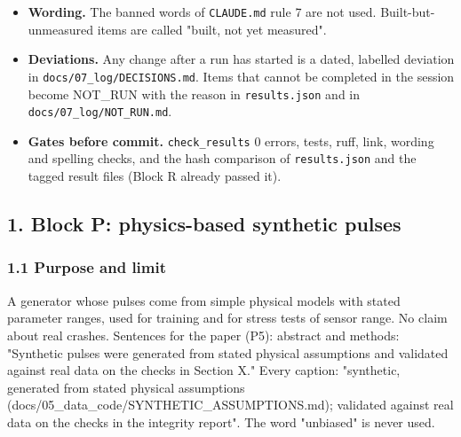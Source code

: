 \begin{itemize}
\item \textbf{Wording.} The banned words of \texttt{CLAUDE.md} rule 7 are not used. Built-but-unmeasured items are called "built, not yet measured".
\item \textbf{Deviations.} Any change after a run has started is a dated, labelled deviation in \texttt{docs/07\_log/DECISIONS.md}. Items that cannot be completed in the session become NOT\_RUN with the reason in \texttt{results.json} and in \texttt{docs/07\_log/NOT\_RUN.md}.
\item \textbf{Gates before commit.} \texttt{check\_results} 0 errors, tests, ruff, link, wording and spelling checks, and the hash comparison of \texttt{results.json} and the tagged result files (Block R already passed it).
\end{itemize}

\subsection*{1. Block P: physics-based synthetic pulses}

\subsubsection*{1.1 Purpose and limit}
A generator whose pulses come from simple physical models with stated parameter ranges, used for training and for stress tests of sensor range. No claim about real crashes. Sentences for the paper (P5): abstract and methods: "Synthetic pulses were generated from stated physical assumptions and validated against real data on the checks in Section X." Every caption: "synthetic, generated from stated physical assumptions (docs/05\_data\_code/SYNTHETIC\_ASSUMPTIONS.md); validated against real data on the checks in the integrity report". The word "unbiased" is never used.

